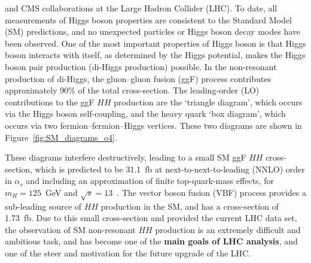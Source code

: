 \documentclass[twoside,11pt]{report}
\begin{document}
    and CMS collaborations at the Large Hadron Collider (LHC).
    To date, all measurements of Higgs boson properties are consistent to
    the Standard Model (SM) predictions,
    and no unexpected particles or Higgs boson decay modes have been observed.
    One of the most important properties of Higgs boson is that Higgs boson
    interacts with itself, as determined by the Higgs potential,
    makes the Higgs boson pair production (di-Higgs production) possible.
    In the non-resonant production of di-Higgs, 
    the gluon--gluon fusion (ggF) process contributes approximately 90\% of 
    the total cross-section. The leading-order (LO) contributions to the ggF $HH$ production are 
    the `triangle diagram', which occurs via the Higgs boson self-coupling, 
    and the heavy quark `box diagram', which occurs via two 
    fermion--fermion--Higgs vertices.
    These two diagrams are shown in Figure~\ref{fig:SM_diagrams_o4}.
    
    These diagrams interfere destructively, leading to a small SM ggF $HH$ cross-section, 
    which is predicted to be 31.1~fb at next-to-next-to-leading (NNLO) order 
    in $\alpha_s$ and including an approximation of finite top-quark-mass effects, 
    for $m_H=125$~GeV and 
    $\sqrt{s}=13$~\TeV. 
    The vector boson fusion (VBF) process provides a sub-leading source 
    of $HH$ production in the SM, and has a cross-section of 1.73~fb. 
    Due to this small cross-section 
    and provided the current LHC data set, 
    the observation of SM non-resonant $HH$ production is an extremely difficult
    and ambitious task, and has become one of the \textbf{main goals of LHC analysis},
    and one of the steer and motivation for the future upgrade of the LHC. 
\end{document}
